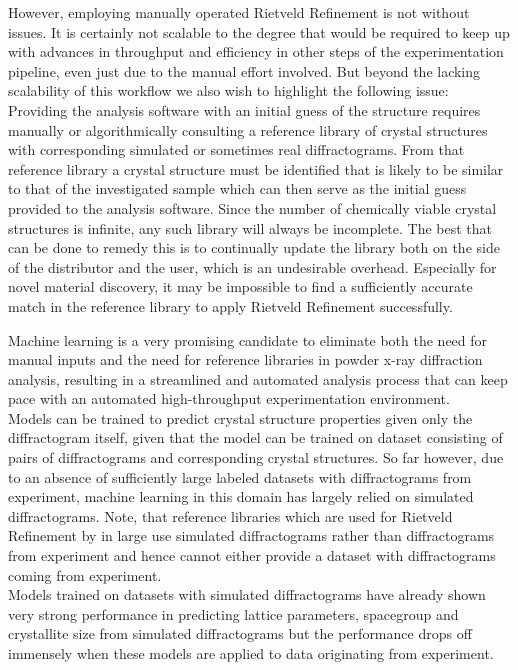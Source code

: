 However, employing manually operated Rietveld Refinement is not without issues.
It is certainly not scalable to the degree that would be required to keep up with advances
in throughput and efficiency in other steps of the experimentation pipeline, even just due to the manual effort involved.
But beyond the lacking scalability of this workflow we also wish to highlight the following issue:
Providing the analysis software with an initial guess of the structure requires manually or algorithmically
consulting a reference library of crystal structures with corresponding simulated or sometimes real diffractograms.
From that reference library a crystal structure must be identified that is likely to be similar
to that of the investigated sample which can then serve as the initial guess provided to the analysis software.
Since the number of chemically viable crystal structures is infinite, any such library will always be incomplete.
The best that can be done to remedy this is to continually update the library both on the side
of the distributor and the user, which is an undesirable overhead.
Especially for novel material discovery, it may be impossible to find a sufficiently accurate match in the reference
library to apply Rietveld Refinement successfully.

Machine learning is a very promising candidate to eliminate both the need for manual inputs and the need for reference
libraries in powder x-ray diffraction analysis, resulting in a streamlined and automated analysis process that can
keep pace with an automated high-throughput experimentation environment. \\

Models can be trained to predict crystal structure properties given only the diffractogram itself, given that
the model can be trained on dataset consisting of pairs of diffractograms and corresponding crystal structures.
So far however, due to an absence of sufficiently large labeled datasets with diffractograms from experiment,
machine learning in this domain has largely relied on simulated diffractograms.
Note, that reference libraries which are used for Rietveld Refinement by in large use simulated diffractograms
rather than diffractograms from experiment and hence cannot either provide a dataset with diffractograms coming
from experiment. \\

Models trained on datasets with simulated diffractograms have already shown very strong performance in predicting
lattice parameters, spacegroup and crystallite size from simulated diffractograms but the performance drops off immensely when these models are applied to data originating from experiment.

